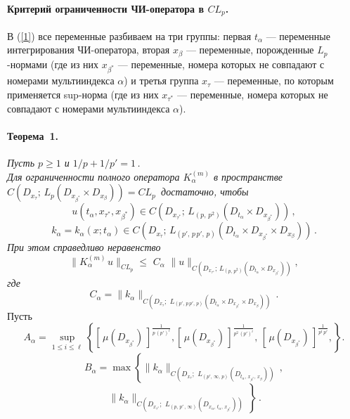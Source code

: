\documentclass{vzmsthesis}
\begin{document}
\paragraph{Критерий ограниченности ЧИ-оператора в $CL_p$.}
В (\ref{1}) все переменные разбиваем на три группы: первая $t_\alpha$ --- переменные интегрирования ЧИ-оператора, вторая  $x_\beta$ --- переменные, порожденные $L_p$-нормами (где из них $x_{\beta^*}$ --- переменные, номера которых не совпадают с номерами мультииндекса $\alpha$) и третья группа $x_{\tau}$ --- переменные, по которым применяется sup-норма (где из них $x_{\tau^*}$ --- переменные, номера которых не совпадают с номерами мультииндекса $\alpha$). 

\paragraph{Теорема~1.}
 {\it Пусть $p \geq1$ и $1/p+1/p'=1$\,. \\
 Для ограниченности полного оператора $K_\alpha^{(m)}$  в пространстве
$C(D_{x_\tau};\,L_{{p}}( D_{x_{\beta^*}} {\times}  D_{x_{\beta}}))=CL_{p}\,$
достаточно, чтобы 
$$
u(t_\alpha,x_{\tau^*},x_{\beta^*})\in
C(D_{x_{\tau^{*}}};\,L_{(p,\, p^2)}(D_{t_\alpha}{\times} D_{x_{\beta^*}} ))\,,
$$
$$
k_\alpha=k_\alpha(x;t_\alpha)\in C(D_{x_\tau};\,L_{(p',\,p\, p',\,p)}(D_{t_\alpha}{\times} D_{x_{\beta^*}}{\times} D_{x_{\beta}} ))\,.
$$
При этом справедливо неравенство
$$
\|K_{\alpha}^{(m)\,} u\|_{CL_{p}}
{\leq}\,\, C_{\alpha} \,\,\|u\|_{C(D_{x_{\tau^*}};\,L_{(p,\,p^2)}(D_{t_\alpha}\times D_{x_{\beta^*}}))},
$$
где
$$
  C_{\alpha}= \|k_{\alpha}\|_{C(D_{x_\tau};\,\, L_{(p',\,p\, p',\, p)}(D_{t_\alpha}\times D_{x_{\beta^*}}\times D_{x_\beta}))}\,.
$$}
 Пусть
$$
A_\alpha=\sup\limits_{1\leq i\leq {\ell}}\left\{[\,\mu(D_{x_{\beta^*}})\,]^{\frac{1}{p \, (p')^\ell}}, [\,\mu(D_{x_{\beta^*}})\,]^{\frac{1}{p^2\,(p')^i}},\, [\,\mu(D_{x_{\beta^*}})\,]^{\frac{1}{p^i \, p'}},\right\}.
$$ 
$$
B_\alpha= \max \left\{\|k_\alpha\|_{C(D_{x_\tau};\,\, L_{(p',\, \infty,\, p)}(D_{t_\alpha,\, x_{\beta^*},\,x_{\beta}}))}\,,\right.
$$
$$
\,\left.\|k_\alpha\|_{ C(D_{x_{\tau^*}};\,\, L_{(p,\, p'\,,\, \infty)}(D_{x_\alpha,\, t_{\alpha},\,x_{\beta^*}}))}\, \right\}\,.
$$ 
\end{document}
